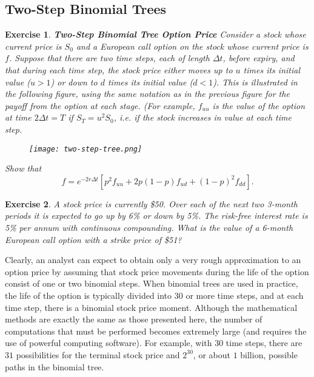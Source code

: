 \documentclass[letterpaper,10pt]{article}
\newtheorem{ex}{Exercise}
\begin{document}
\subsection{Two-Step Binomial Trees}


\begin{ex}{\bf Two-Step Binomial Tree Option Price}
Consider a stock whose current price is $S_0$ and a European call option on the stock whose current price is $f$.  Suppose that there are two time steps, each of length $\Delta t$, before expiry, and that during each time step, the stock price either moves up to $u$ times its initial value ($u>1$) or down to $d$ times its initial value ($d<1$).  This is illustrated in the following figure, using the same notation as in the previous figure for the payoff from the option at each stage.  (For example, $f_{uu}$ is the value of the option at time $2\Delta t=T$ if $S_T=u^2S_0$, i.e. if the stock increases in value at each time step.

\begin{center}
\begin{figure}[H]
\texttt{[image: two-step-tree.png]}
\end{figure}
\end{center}

Show that $$f=e^{-2r\Delta t}\left[p^2f_{uu}+2p(1-p)f_{ud}+(1-p)^2f_{dd}\right].$$

\end{ex}


\begin{ex}
A stock price is currently \$50. Over each of the next two 3-month periods it is expected to go up by 6\% or down by 5\%. The risk-free interest rate is 5\% per annum with continuous compounding. What is the value of a 6-month European call option with a strike price of \$51?
\end{ex}



\noindent Clearly, an analyst can expect to obtain only a very rough approximation to an option price by assuming that stock price movements during the life of the option consist of one or two binomial steps. When binomial trees are used in practice, the life of the option is typically divided into $30$ or more time steps, and at each time step, there is a binomial stock price moment.  Although the mathematical methods are exactly the same as those presented here, the number of computations that must be performed becomes extremely large (and requires the use of powerful computing software).  For example, with $30$ time steps, there are $31$ possibilities for the terminal stock price and $2^{30}$, or about $1$ billion, possible paths in the binomial tree.
\end{document}
